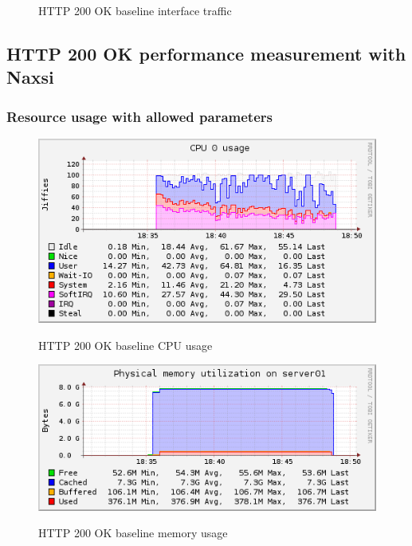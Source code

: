 \documentclass[Measurement results]{subfiles}
\begin{document}
\begin{figure}[H]
\centering
\caption{HTTP 200 OK baseline interface traffic}
\label{fig:Baseline Nginx interface traffic}
\end{figure}


\subsection{HTTP 200 OK performance measurement with Naxsi}
\subsubsection{Resource usage with allowed parameters}
\begin{figure}[H]
\centering
\caption{HTTP 200 OK baseline CPU usage}
\includegraphics[scale=0.7]{images/results/200_with_naxsi_incremented_allowed_parameters/cpu.png}
\label{fig:Baseline Nginx CPU usage}
\end{figure}

\begin{figure}[H]
\centering
\caption{HTTP 200 OK baseline memory usage}
\includegraphics[scale=0.7]{images/results/200_with_naxsi_incremented_allowed_parameters/memory.png}
\label{fig:Baseline Nginx memory usage}
\end{figure}
\end{document}
